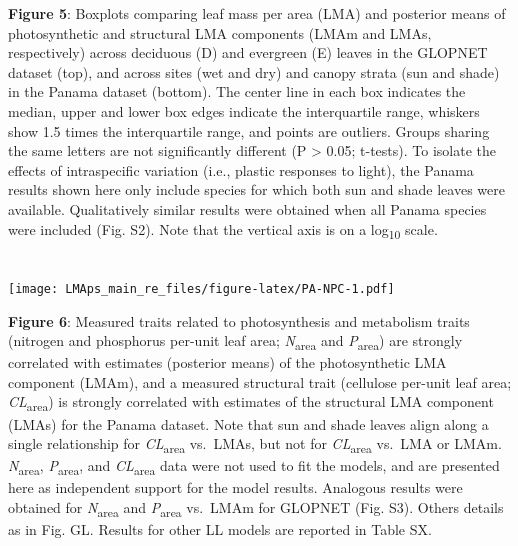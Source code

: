 \documentclass[12pt,]{article}
\theoremstyle{definition}
\theoremstyle{definition}
\theoremstyle{definition}
\theoremstyle{remark}
\begin{document}
\textbf{Figure 5}: Boxplots comparing leaf mass per area (LMA) and
posterior means of photosynthetic and structural LMA components (LMAm
and LMAs, respectively) across deciduous (D) and evergreen (E) leaves in
the GLOPNET dataset (top), and across sites (wet and dry) and canopy
strata (sun and shade) in the Panama dataset (bottom). The center line
in each box indicates the median, upper and lower box edges indicate the
interquartile range, whiskers show 1.5 times the interquartile range,
and points are outliers. Groups sharing the same letters are not
significantly different (P \textgreater{} 0.05; t-tests). To isolate the
effects of intraspecific variation (i.e., plastic responses to light),
the Panama results shown here only include species for which both sun
and shade leaves were available. Qualitatively similar results were
obtained when all Panama species were included (Fig. S2). Note that the
vertical axis is on a log\textsubscript{10} scale.

\newpage

\hypertarget{section-5}{%
\section{}\label{section-5}}

\texttt{[image: LMAps\_main\_re\_files/figure-latex/PA-NPC-1.pdf]}

\textbf{Figure 6}: Measured traits related to photosynthesis and
metabolism traits (nitrogen and phosphorus per-unit leaf area;
\emph{N}\textsubscript{area} and \emph{P}\textsubscript{area}) are
strongly correlated with estimates (posterior means) of the
photosynthetic LMA component (LMAm), and a measured structural trait
(cellulose per-unit leaf area; \emph{CL}\textsubscript{area}) is
strongly correlated with estimates of the structural LMA component
(LMAs) for the Panama dataset. Note that sun and shade leaves align
along a single relationship for \emph{CL}\textsubscript{area} vs.~LMAs,
but not for \emph{CL}\textsubscript{area} vs.~LMA or LMAm.
\emph{N}\textsubscript{area}, \emph{P}\textsubscript{area}, and
\emph{CL}\textsubscript{area} data were not used to fit the models, and
are presented here as independent support for the model results.
Analogous results were obtained for \emph{N}\textsubscript{area} and
\emph{P}\textsubscript{area} vs.~LMAm for GLOPNET (Fig. S3). Others
details as in Fig. GL. Results for other LL models are reported in Table
SX.
\end{document}

